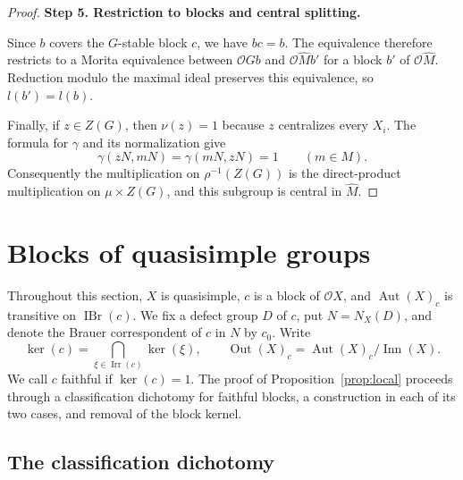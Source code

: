 \documentclass[11pt,a4paper]{article}
\theoremstyle{definition}
\theoremstyle{remark}
\numberwithin{equation}{section}
\newcommand{\cO}{\mathcal{O}}
\DeclareMathOperator{\Irr}{Irr}
\DeclareMathOperator{\IBr}{IBr}
\DeclareMathOperator{\Aut}{Aut}
\DeclareMathOperator{\Inn}{Inn}
\DeclareMathOperator{\Out}{Out}
\newcommand{\proofstep}[1]{%
	\par\addvspace{\medskipamount}%
	\noindent\textbf{#1}\par\nobreak
	\smallskip\nobreak\noindent\ignorespaces
}
\begin{document}
\begin{proof}
		\proofstep{Step 5. Restriction to blocks and central splitting.}
		Since $b$ covers the $G$-stable block $c$, we have $bc=b$.
		The equivalence therefore restricts to a Morita equivalence between
		$\cO Gb$ and $\cO\widehat M b'$ for a block $b'$ of
		$\cO\widehat M$. Reduction modulo the maximal ideal preserves
		this equivalence, so $l(b')=l(b)$.
		
		Finally, if $z\in Z(G)$, then $\nu(z)=1$ because $z$ centralizes
		every $X_i$. The formula for $\gamma$ and its normalization give
		\[
		\gamma(zN,mN)=\gamma(mN,zN)=1\qquad(m\in M).
		\]
		Consequently the multiplication on $\rho^{-1}(Z(G))$ is the
		direct-product multiplication on $\mu\times Z(G)$, and this
		subgroup is central in $\widehat M$.
	\end{proof}
	
	
	\section{Blocks of quasisimple groups}\label{sec:quasisimple}
	Throughout this section, $X$ is quasisimple, $c$ is a block of
	$\cO X$, and $\Aut(X)_c$ is transitive on $\IBr(c)$. We fix a defect
	group $D$ of $c$, put $N=N_X(D)$, and denote the Brauer correspondent
	of $c$ in $N$ by $c_0$. Write
	\[
	\ker(c)=\bigcap_{\xi\in\Irr(c)}\ker(\xi),\qquad
	\Out(X)_c=\Aut(X)_c/\Inn(X).
	\]
	We call $c$ faithful if $\ker(c)=1$.
	The proof of Proposition~\ref{prop:local} proceeds through a
	classification dichotomy for faithful blocks, a construction in each
	of its two cases, and removal of the block kernel.
	
	\subsection{The classification dichotomy}
	
\end{document}
